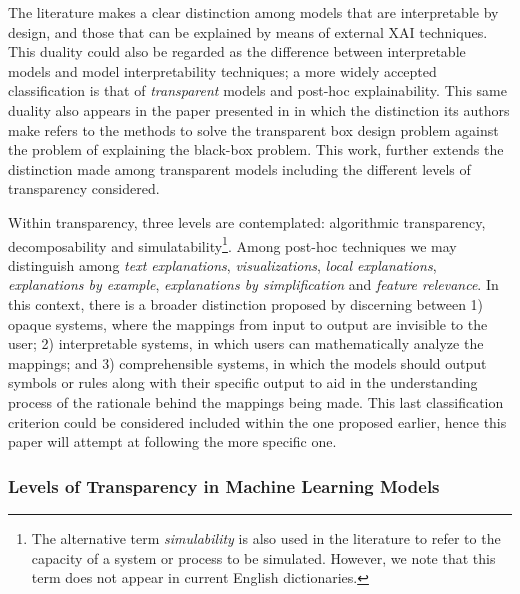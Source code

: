 \documentclass[final]{elsarticle}
\begin{document}
The literature makes a clear distinction among models that are interpretable by design, and those that can be explained by means of external XAI techniques. This duality could also be regarded as the difference between interpretable models and model interpretability techniques; a more widely accepted classification is that of \emph{transparent} models and post-hoc explainability. This same duality also appears in the paper presented in \cite{Guidotti19} in which the distinction its authors make refers to the methods to solve the transparent box design problem against the problem of explaining the black-box problem. This work, further extends the distinction made among transparent models including the different levels of transparency considered.

Within transparency, three levels are contemplated: algorithmic transparency, decomposability and simulatability\footnote{The alternative term \textit{simulability} is also used in the literature to refer to the capacity of a system or process to be simulated. However, we note that this term does not appear in current English dictionaries.}. Among post-hoc techniques we may distinguish among \textit{text explanations}, \textit{visualizations}, \textit{local explanations}, \textit{explanations by example}, \textit{explanations by simplification} and \textit{feature relevance}. In this context, there is a broader distinction proposed by \cite{WhatDoesExplainableAImean} discerning between 1) opaque systems, where the mappings from input to output are invisible to the user; 2) interpretable systems, in which users can mathematically analyze the mappings; and 3) comprehensible systems, in which the models should output symbols or rules along with their specific output to aid in the understanding process of the rationale behind the mappings being made. This last classification criterion could be considered included within the one proposed earlier, hence this paper will attempt at following the more specific one.

\subsubsection{Levels of Transparency in Machine Learning Models} \label{sec:transparent-models}
\end{document}
